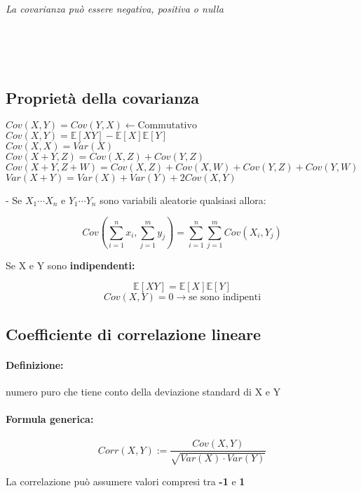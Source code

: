 \documentclass[]{article}
\newcommand{\ev}{\mathbb{E}[X]}
\renewcommand{\ev}[1]{\mathbb{E}[#1]}
\newcommand{\definizione}{\paragraph{Definizione:}}
\newcommand{\formula}{\paragraph{Formula generica:}}
\begin{document}
    \begin{center} 
        \textit{La covarianza può essere negativa, positiva o nulla } 
    \end{center}
     \\
     \\
     \\

    \subsection{Proprietà della covarianza}
    
    $ Cov(X, Y) = Cov(Y, X) \longleftarrow \text{Commutativo} $ \\
    $ Cov(X, Y) = \ev{XY} - \ev{X} \ev{Y} $ \\ 
    $ Cov(X, X) = Var(X) $ \\
    $ Cov(X+Y, Z) = Cov(X, Z) + Cov(Y, Z) $ \\
    $ Cov(X+Y, Z+W) = Cov(X, Z) + Cov(X, W) + Cov(Y, Z) + Cov(Y, W) $ \\
    $ Var(X + Y) = Var(X) + Var(Y) + 2 Cov(X, Y) $ \\
    
    \centerline{- Se $X_1 \cdots X_n$ e $Y_1 \cdots Y_n$ sono variabili aleatorie qualsiasi allora:}
    \[ Cov(\sum_{i = 1}^{n}x_i, \sum_{j = 1}^{m} y_j) = \sum_{i = 1}^{n} \sum_{j = 1}^{m} Cov(X_i, Y_j) \]
    \linebreak[10]
    \centerline{Se X e Y sono \textbf{indipendenti:}}
    \[ \ev{XY} = \ev{X} \ev{Y} \]
    \[ Cov(X, Y) = 0 \longrightarrow \text{se sono indipenti}\]

    
    \subsection{Coefficiente di correlazione lineare}
    \definizione numero puro che tiene conto della deviazione standard di X e Y
    \formula
    \begin{equation*}
        Corr(X,Y) := \frac{Cov(X,Y)}{\sqrt{Var(X) \cdot Var(Y)}}
    \end{equation*}

    \begin{center}
        La correlazione può assumere valori compresi tra \textbf{-1} e \textbf{1}
    \end{center}
     \\
     \\
     \\
\end{document}
